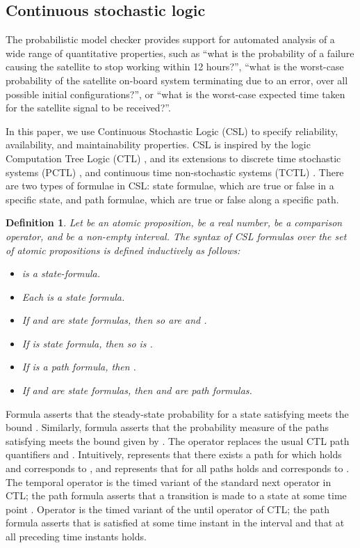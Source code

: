 \documentclass[preprint,12pt]{qrei}
\newtheorem{mydef}{Definition}
\begin{document}
\subsection{Continuous stochastic logic}

The probabilistic model checker  provides support for automated analysis of a wide range of quantitative properties, such as \textquotedblleft what is the probability of a failure causing the satellite to stop working within 12 hours?\textquotedblright, \textquotedblleft what is the worst-case probability of the satellite on-board system terminating due to an error, over all possible initial configurations?\textquotedblright, or \textquotedblleft what is the worst-case expected time taken for the satellite signal to be received?\textquotedblright.

In this paper, we use Continuous Stochastic Logic (CSL) \cite{ASS+96,BKH99} to specify reliability, availability, and maintainability properties. CSL is inspired by the logic Computation Tree Logic (CTL) \cite{Eme90}, and its extensions to discrete time stochastic systems (PCTL) \cite{HJ94}, and continuous time non-stochastic systems (TCTL) \cite{ACD90}. There are two types of formulae in CSL: state formulae, which are true or false in a specific state, and path formulae, which are true or false along a specific path.

\begin{mydef}\label{def:csl}
Let  be an atomic proposition,  be a real number,  be a comparison operator, and  be a non-empty interval. The syntax of CSL formulas over the set of atomic propositions  is defined inductively as follows:
\begin{itemize}
\item  is a state-formula.
\item Each  is a state formula.
\item If  and  are state formulas, then so are  and .
\item If  is state formula, then so is .
\item If  is a path formula, then .
\item If  and  are state formulas, then  and  are path formulas.
\end{itemize}
\end{mydef}

Formula  asserts that the steady-state probability for a state satisfying  meets the bound . Similarly, formula  asserts that the probability measure of the paths satisfying  meets the bound given by . The operator  replaces the usual CTL path quantifiers  and . Intuitively,  represents that there exists a path for which  holds and corresponds to , and  represents that for all paths  holds and corresponds to . The temporal operator  is the timed variant of the standard next operator in CTL; the path formula  asserts that a transition is made to a  state at some time point . Operator  is the timed variant of the until operator of CTL; the path formula  asserts that  is satisfied at some time instant in the interval  and that at all preceding time instants  holds.
\end{document}
